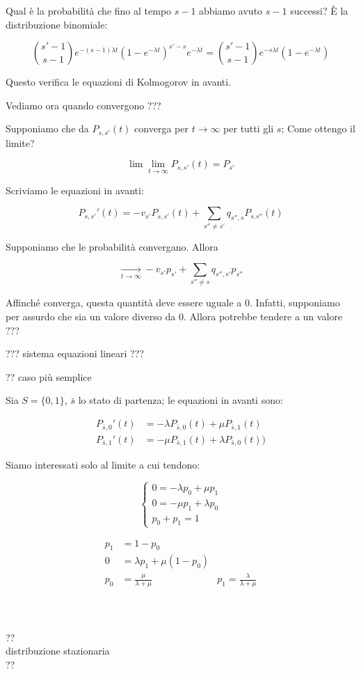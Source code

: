\documentclass[a4paper,12pt]{book}
\begin{document}
Qual è la probabilità che fino al tempo $ s-1 $ abbiamo avuto $ s-1 $ successi? È la distribuzione binomiale:

$$ \binom{s'-1}{s-1}e^{-(s-1)\lambda t}(1-e^{-\lambda t})^{s'-s}e^{-\lambda t} = \binom{s'-1}{s-1} e^{-s\lambda t}(1-e^{-\lambda t})$$

Questo verifica le equazioni di Kolmogorov in avanti. 


Vediamo ora quando convergono ??? %

Supponiamo che da $ P_{s,s'}(t) $ converga per $ t \to \infty $ per tutti gli $ s $; Come ottengo il limite? %

$$ \lim\lim\limits_{t \to \infty} P_{s,s'}(t) = P_{s'} $$ %

Scriviamo le equazioni in avanti:

$$ P_{s,s'}'(t) = -v_{s'} P_{s,s'}(t) + \sum_{s'' \ne s'}q_{s'',s} P_{s.s''}(t) $$

Supponiamo che le probabilità convergano. Allora 

$$ \underset{t \to \infty}{\longrightarrow} -v_{s'}p_{s'} + \sum_{s'' \ne s} q_{s'',s'}p_{s''} $$

Affinché converga, questa quantità deve essere uguale a 0. Infatti, supponiamo per assurdo che sia un valore diverso da 0. Allora potrebbe tendere a un valore ??? %

??? sistema equazioni lineari ??? %

?? caso più semplice %

Sia $ S = \{0,1\} $, $ \bar{s} $ lo stato di partenza; le equazioni in avanti sono:

\begin{align*}
	P_{\bar{s},0}'(t) & = -\lambda P_{\bar{s},0}(t) + \mu P_{\bar{s},1}(t) \\
	P_{\bar{s},1}'(t) & = -\mu P_{\bar{s},1}(t) + \lambda P_{\bar{s},0}(t)) %
\end{align*}

Siamo interessati solo al limite a cui tendono: %

$$
\begin{cases}
	0 = -\lambda p_0 + \mu p_1 \\
	0 = -\mu p_1 + \lambda p_0 \\
	p_0 + p_1 = 1
\end{cases}
$$

\begin{multicols}{2}
	\begin{align*}
	p_1 & = 1-p_0 \\
	0 & = \lambda p_1 + \mu(1 - p_0) \\
	p_0 & = \frac{\mu}{\lambda + \mu} & p_1 = \frac{\lambda}{\lambda + \mu}
	\end{align*}
	\\
	\\
	\\
	?? %
	\\
	distribuzione stazionaria
	\\
	??
\end{multicols}
\end{document}
